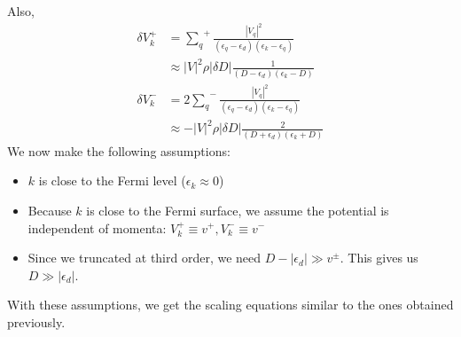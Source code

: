 \documentclass[twoside,11pt]{report}
\numberwithin{equation}{section}
\begin{document}
Also,
\begin{equation}\begin{aligned}
\delta V_k^+ &= {\sum_q}^+ \frac{|V_q|^2}{(\epsilon_q - \epsilon_d)(\epsilon_k - \epsilon_q)}\\
           &\approx |V|^2 \rho |\delta D|\frac{1}{(D - \epsilon_d)(\epsilon_k - D)}\\
\delta V_k^- &= 2{\sum_q}^- \frac{|V_q|^2}{(\epsilon_q - \epsilon_d)(\epsilon_k - \epsilon_q)}\\
           &\approx -|V|^2 \rho |\delta D|\frac{2}{(D + \epsilon_d)(\epsilon_k + D)}
\end{aligned}\end{equation}
We now make the following assumptions:
\begin{itemize}
	\item \(k\) is close to the Fermi level (\(\epsilon_k \approx 0\))
	\item Because \(k\) is close to the Fermi surface, we assume the potential is independent of momenta: \(V_k^+ \equiv v^+, V^-_k \equiv v^-\)
	\item Since we truncated at third order, we need \(D - |\epsilon_d| \gg v^\pm\).
		This gives us \(D \gg |\epsilon_d|\).
\end{itemize}
With these assumptions, we get the scaling equations similar to the ones obtained previously.
\end{document}
